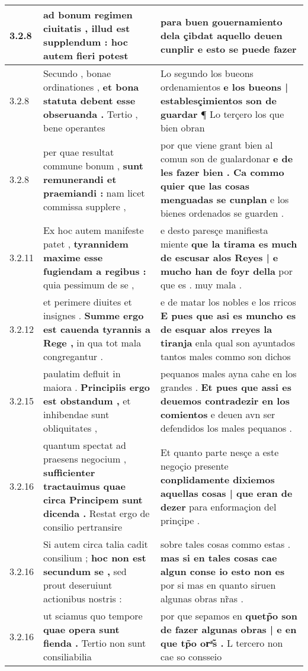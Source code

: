 \begin{tabular}{|p{1cm}|p{6.5cm}|p{6.5cm}|}
3.2.8 & ad bonum regimen ciuitatis , \textbf{ illud est supplendum : } hoc autem fieri potest & para buen gouernamiento dela çibdat \textbf{ aquello deuen cunplir } e esto se puede fazer \\\hline
3.2.8 & Secundo , bonae ordinationes , \textbf{ et bona statuta debent esse obseruanda . } Tertio , bene operantes & Lo segundo los bueons ordenamientos \textbf{ e los bueons | establesçimientos son de guardar } ¶ Lo terçero los que bien obran \\\hline
3.2.8 & per quae resultat commune bonum , \textbf{ sunt remunerandi et praemiandi : } nam licet commissa supplere , & por que viene grant bien al comun son de gualardonar \textbf{ e de les fazer bien . Ca commo quier que las cosas menguadas se cunplan } e los bienes ordenados se guarden . \\\hline
3.2.11 & Ex hoc autem manifeste patet , \textbf{ tyrannidem maxime esse fugiendam a regibus : } quia pessimum de se , & e desto paresçe manifiesta miente \textbf{ que la tirama es much de escusar alos Reyes | e mucho han de foyr della } por que es . muy mala . \\\hline
3.2.12 & et perimere diuites et insignes . \textbf{ Summe ergo est cauenda tyrannis a Rege , } in qua tot mala congregantur . & e de matar los nobles e los rricos \textbf{ E pues que asi es muncho es de esquar alos rreyes la tiranja } enla qual son ayuntados tantos males commo son dichos \\\hline
3.2.15 & paulatim defluit in maiora . \textbf{ Principiis ergo est obstandum , } et inhibendae sunt obliquitates , & pequanos males ayna cahe en los grandes . \textbf{ Et pues que assi es deuemos contradezir en los comientos } e deuen avn ser defendidos los males pequanos . \\\hline
3.2.16 & quantum spectat ad praesens negocium , \textbf{ sufficienter tractauimus quae circa Principem sunt dicenda . } Restat ergo de consilio pertransire & Et quanto parte nesçe a este negoçio presente \textbf{ conplidamente dixiemos aquellas cosas | que eran de dezer } para enformaçion del prinçipe . \\\hline
3.2.16 & Si autem circa talia cadit consilium ; \textbf{ hoc non est secundum se , } sed prout deseruiunt actionibus nostris : & sobre tales cosas commo estas . \textbf{ mas si en tales cosas cae algun conse io esto non es } por si mas en quanto siruen algunas obras nr̃as . \\\hline
3.2.16 & ut sciamus quo tempore \textbf{ quae opera sunt fienda . } Tertio non sunt consiliabilia & por que sepamos en \textbf{ quetp̃o son de fazer algunas obras | e en que tp̃o orͣ̃s . } L tercero non cae so consseio \\\hline

\end{tabular}
